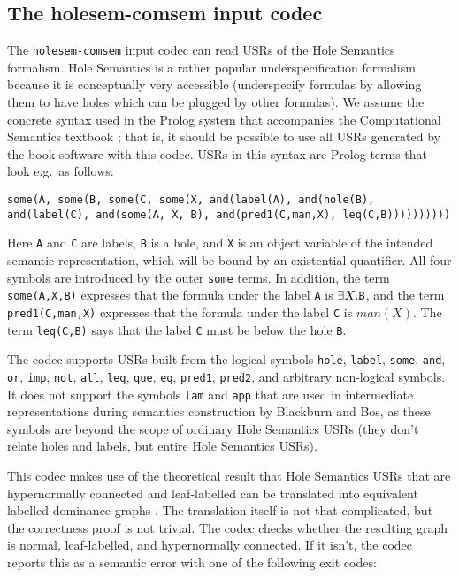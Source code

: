 


\subsection{The holesem-comsem input codec}

The \verb?holesem-comsem? input codec can read USRs of the Hole
Semantics formalism. Hole Semantics \cite{Bos96} is a rather popular
underspecification formalism because it is conceptually very
accessible (underspecify formulas by allowing them to have holes which
can be plugged by other formulas). We assume the concrete syntax used
in the Prolog system that accompanies the Computational Semantics
textbook \cite{blackburn05:_repres_infer_natur_languag}; that is, it
should be possible to use all USRs generated by the book software with
this codec. USRs in this syntax are Prolog terms that look e.g.\ as
follows:

\begin{verbatim}
some(A, some(B, some(C, some(X, and(label(A), and(hole(B),
and(label(C), and(some(A, X, B), and(pred1(C,man,X), leq(C,B))))))))))
\end{verbatim}

Here \verb?A? and \verb?C? are labels, \verb?B? is a hole, and
\verb?X? is an object variable of the intended semantic
representation, which will be bound by an existential quantifier. All
four symbols are introduced by the outer \verb?some? terms. In
addition, the term \verb?some(A,X,B)? expresses that the formula under
the label \verb?A? is $\exists X. \verb?B?$, and the term
\verb?pred1(C,man,X)? expresses that the formula under the label
\verb?C? is $man(X)$. The term \verb?leq(C,B)? says that the label
\verb?C? must be below the hole \verb?B?.

The codec supports USRs built from the logical symbols \verb?hole?,
\verb?label?, \verb?some?, \verb?and?, \verb?or?, \verb?imp?,
\verb?not?, \verb?all?, \verb?leq?, \verb?que?, \verb?eq?,
\verb?pred1?, \verb?pred2?, and arbitrary non-logical symbols. It does
not support the symbols \verb?lam? and \verb?app? that are used in
intermediate representations during semantics construction by
Blackburn and Bos, as these symbols are beyond the scope of ordinary
Hole Semantics USRs (they don't relate holes and labels, but entire
Hole Semantics USRs).

This codec makes use of the theoretical result that Hole Semantics
USRs that are hypernormally connected and leaf-labelled can be
translated into equivalent labelled dominance graphs
\cite{KolNieTha03}. The translation itself is not that complicated,
but the correctness proof is not trivial. The codec checks whether the
resulting graph is normal, leaf-labelled, and hypernormally
connected. If it isn't, the codec reports this as a semantic error
with one of the following exit codes:

